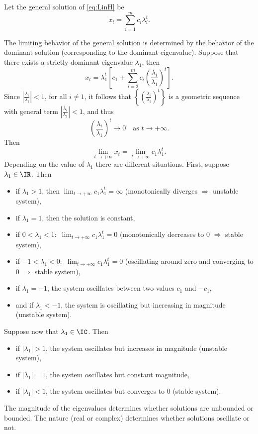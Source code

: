 Let the general solution of \eqref{eq:LinH} be
$$x_t=\sum_{i=1}^m c_i \lambda_i^t.$$

The limiting behavior of the general solution is determined by the behavior of the dominant solution (corresponding to the dominant eigenvalue). Suppose that there exists a strictly dominant eigenvalue $\lambda_1$, then
$$x_t=\lambda _1^t\left[ c_1+\sum_{i=2}^m c_i\left ( \frac{\lambda_i}{\lambda_1}\right )^t\right ].$$
Since $\left |\frac{\lambda _i}{\lambda _1}\right |<1$, for all $i\not =1$, it follows that $\left\{\left( \frac{\lambda_i}{\lambda_1}\right )^t\right\}$ is a geometric sequence with general term $\left|\frac{\lambda_i}{\lambda_1}\right|<1$, and thus 
\[
\left( \frac{\lambda_i}{\lambda_1}\right )^t\to 0\quad\textrm{as }
t\rightarrow +\infty.
\]
Then $$\lim _{t\rightarrow +\infty }x_t=\lim _{t\rightarrow +\infty }c_1\lambda _1^t.$$
Depending on the value of $\lambda _1$ there are different situations. First, suppose $\lambda_1\in\IR$. Then
\begin{itemize}
\item if $\lambda _1 >1$, then $\lim _{t\rightarrow +\infty }c_1\lambda _1^t=\infty$ (monotonically diverges $\Rightarrow$ unstable system),
\item if $\lambda _1 =1$, then the solution is constant,
\item if $0 <\lambda _1 <1:$ $\lim _{t\rightarrow +\infty }c_1\lambda _1^t=0$ (monotonically decreases to 0 $\Rightarrow$ stable system),
\item if $-1 <\lambda _1 <0:$ $\lim _{t\rightarrow +\infty }c_1\lambda _1^t=0$ (oscillating around zero and converging to 0 $\Rightarrow$ stable system),
\item if $\lambda_1 =-1$, the system oscillates between two values $c_1$ and $-c_1$,
\item and if $\lambda _1 <-1$, the system is oscillating but increasing in magnitude (unstable system).
\end{itemize}
Suppose now that $\lambda_1\in\IC$. Then
\begin{itemize}
\item if $|\lambda _1|>1$, the system oscillates but increases in magnitude (unstable system),
\item if $|\lambda _1|=1$, the system oscillates but constant magnitude,
\item if $|\lambda _1|<1$, the system oscillates but converges to 0 (stable system).
\end{itemize}
The magnitude of the eigenvalues determines whether solutions are unbounded or bounded. The nature (real or complex) determines whether solutions oscillate or not.

